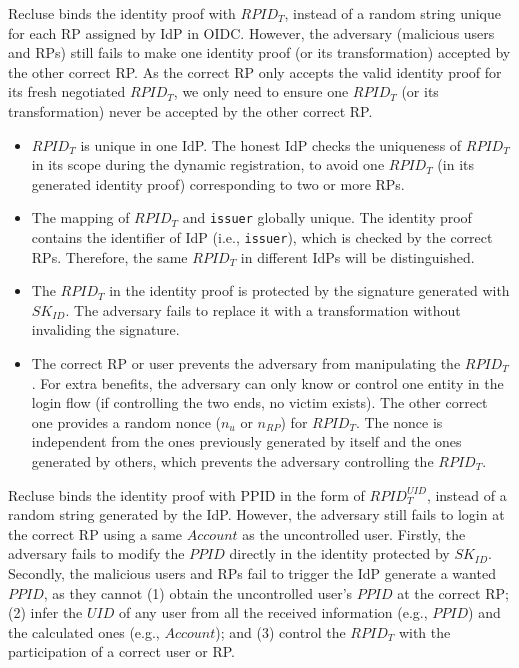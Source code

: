 Recluse binds the identity proof with $RPID_T$, instead of a random string unique for each RP assigned by IdP in OIDC. However, the adversary (malicious users and RPs) still fails to  make one identity proof (or its transformation) accepted by the other correct RP. As the correct RP only accepts the valid identity proof for its fresh negotiated $RPID_T$, we only need to ensure one $RPID_T$ (or its transformation) never be accepted by the other correct RP.
\begin{itemize}
\item $RPID_T$ is unique in one IdP. The honest IdP checks the uniqueness of $RPID_T$ in its scope during the dynamic registration, to avoid one $RPID_T$ (in its generated identity proof) corresponding to two or more RPs.
\item The mapping of $RPID_T$ and \verb+issuer+ globally unique. The identity proof contains the identifier of IdP (i.e., \verb+issuer+), which is checked by the correct RPs. Therefore, the same $RPID_T$ in different IdPs will be distinguished.
\item The $RPID_T$ in the identity proof is protected by the signature generated with $SK_{ID}$. The adversary fails to replace it with a transformation without invaliding the signature.
\item The correct RP or user prevents the adversary from manipulating the $RPID_T$. For extra benefits, the adversary can only know or control one entity in the login flow (if controlling the two ends, no victim exists). The other correct one provides a random nonce ($n_u$ or $n_{RP}$) for $RPID_T$. The nonce is independent from the ones previously generated by itself  and the ones generated by others, which prevents the adversary controlling the $RPID_T$.

\end{itemize}

Recluse binds the identity proof with PPID  in the form of $RPID_T^{UID}$, instead of a random string generated by the IdP. However, the adversary still fails to login at the correct RP using a same $Account$ as the uncontrolled user. Firstly,  the adversary fails to  modify the $PPID$ directly in the identity protected by $SK_{ID}$. Secondly, the malicious users and RPs fail to trigger the IdP generate a wanted $PPID$, as they cannot (1) obtain the uncontrolled user's $PPID$ at the correct RP; (2) infer the $UID$ of any user from all the received  information (e.g., $PPID$) and the calculated ones (e.g., $Account$); and (3) control the $RPID_T$ with the participation of a correct user or RP.

